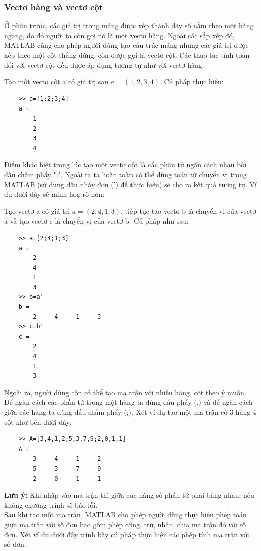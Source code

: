 \documentclass[12pt,a4paper]{article}
\begin{document}
\subsubsection{Vectơ hàng và vectơ cột}
Ở phần trước, các giá trị trong mảng được xếp thành dãy số nằm theo một hàng ngang, do đó người ta còn gọi nó là một vectơ hàng. Ngoài các sắp xếp đó, MATLAB cũng cho phép người dùng tạo cấu trúc mảng nhưng các giá trị được xếp theo một cột thẳng đứng, còn được gọi là vectơ cột. Các thao tác tính toán đối với vectơ cột đều được áp dụng tương tự như với vectơ hàng.
\begin{example}
Tạo một vectơ cột a có giá trị sau $a=(1,2,3,4)$. Cú pháp thực hiện:
\begin{lstlisting}
	>> a=[1;2;3;4]
	a =
     	1
     	2
     	3
     	4
\end{lstlisting}
\end{example}
Điểm khác biệt trong lúc tạo một vectơ cột là các phần tử ngăn cách nhau bởi dấu chấm phẩy ";". Ngoài ra ta hoàn toàn có thể dùng toán tử chuyển vị trong MATLAB (sử dụng dấu nháy đơn (') để thực hiện) sẽ cho ra kết quả tương tự. Ví dụ dưới đây sẽ minh hoạ rõ hơn:
\begin{example}
Tạo vectơ a có giá trị $a=(2,4,1,3)$, tiếp tục tạo vectơ b là chuyển vị của vectơ a và tạo vectơ c là chuyển vị của vectơ b. Cú pháp như sau:
\begin{lstlisting}
	>> a=[2;4;1;3]
	a =
     	2
     	4
     	1
     	3
	>> b=a'
	b =
     	2     4     1     3
	>> c=b'
	c =
     	2
     	4
     	1
     	3
\end{lstlisting}
\end{example}
Ngoài ra, người dùng còn có thể tạo ma trận với nhiều hàng, cột theo ý muốn. Để ngăn cách các phần tử trong một hàng ta dùng dấu phẩy (,) và để ngăn cách giữa các hàng ta dùng dấu chấm phẩy (;). Xét ví dụ tạo một ma trận có 3 hàng 4 cột như bên dưới đây:
\begin{lstlisting}
	>> A=[3,4,1,2;5,3,7,9;2,0,1,1]
	A =
     	3     4     1     2
     	5     3     7     9
     	2     0     1     1
\end{lstlisting}
\textbf{Lưu ý:} Khi nhập vào ma trận thì giữa các hàng số phần tử phải bằng nhau, nếu không chương trình sẽ báo lỗi.\\
Sau khi tạo một ma trận, MATLAB cho phép người dùng thực hiện phép toán giữa ma trận với số đơn bao gồm phép cộng, trừ, nhân, chia ma trận đó với số đơn. Xét ví dụ dưới đây trình bày cú pháp thực hiện các phép tính ma trận với số đơn.\\
\end{document}
